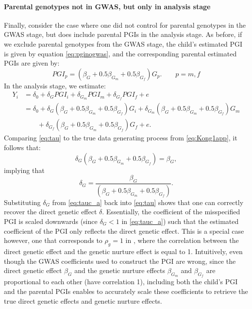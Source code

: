 \documentclass[12pt,a4paper]{article}
\begin{document}
\begin{bibunit}
\paragraph{Parental genotypes not in GWAS, but only in analysis stage}
Finally, consider the case where one did not control for parental genotypes in the GWAS stage, but does include parental PGIs in the analysis stage. As before, if we exclude parental genotypes from the GWAS stage, the child's estimated PGI is given by equation \autoref{eq:pginogwas}, and the corresponding parental estimated PGIs are given by: 
\begin{equation}
PGI_{p} = \left(\beta_G +  0.5 \beta_{G_m} + 0.5 \beta_{G_f} \right) G_{p}. \qquad p=m,f
\end{equation}
In the analysis stage, we estimate:
\begin{align} Y_i &= \delta_0 + \delta_G PGI_i + \delta_{G_m} PGI_{m} + \delta_{G_f} PGI_{f} + e \nonumber\\
&= \delta_0 + \delta_G \left(\beta_G +  0.5 \beta_{G_m} + 0.5 \beta_{G_f} \right) G_i   + \delta_{G_m} \left(\beta_G +  0.5 \beta_{G_m} + 0.5 \beta_{G_f} \right) G_{m}  \nonumber\\
 & \qquad + \delta_{G_f} \left(\beta_G +  0.5 \beta_{G_m} + 0.5 \beta_{G_f} \right) G_{f} + e. \label{eq:tau}
 \end{align} 
Comparing \autoref{eq:tau} to the true data generating process from \autoref{eq:Kong1app}, it follows that:
\begin{equation}
    \delta_G \left(\beta_G +  0.5 \beta_{G_m} + 0.5 \beta_{G_f} \right) = \beta_G,
\end{equation} implying that 
\begin{equation} \label{eq:tauc_a}
\delta_G = \frac{\beta_G}{\left(\beta_G +  0.5 \beta_{G_m} + 0.5 \beta_{G_f} \right)}. 
\end{equation} Substituting $\delta_G$ from \autoref{eq:tauc_a} back into \autoref{eq:tau} shows that one can correctly recover the direct genetic effect $\delta$. Essentially, the coefficient of the misspecified PGI is scaled downwards (since $\delta_G < 1$ in \autoref{eq:tauc_a}) such that the estimated coefficient of the PGI only reflects the direct genetic effect. This is a special case however, one that corresponds to $\rho_g=1$ in \citet{Trejo2019}, where the correlation between the direct genetic effect and the genetic nurture effect is equal to 1. Intuitively, even though the GWAS coefficients used to construct the PGI are wrong, since the direct genetic effect $\beta_G$ and the genetic nurture effects $\beta_{G_m}$ and $\beta_{G_f}$ are proportional to each other (have correlation 1), including both the child's PGI and the parental PGIs enables to accurately scale these coefficients to retrieve the true direct genetic effects and genetic nurture effects. 


\end{bibunit}
\end{document}
